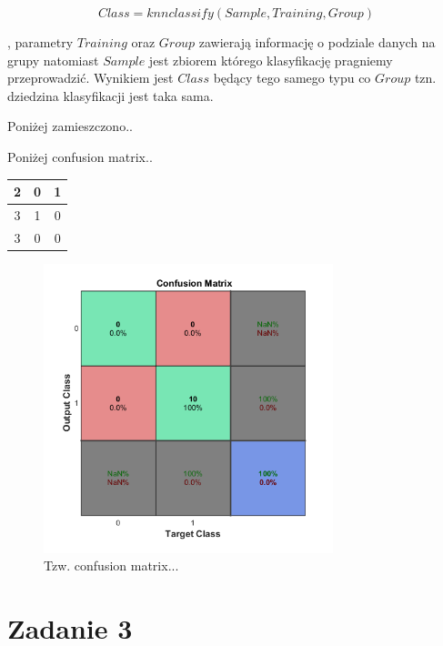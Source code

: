 \documentclass[11pt, a4paper]{article}
\begin{document}
\begin{equation}\label{eq:knnclasify}
Class = knnclassify(Sample, Training, Group)
\end{equation}

, parametry $Training$ oraz $Group$ zawierają informację o podziale danych na grupy natomiast $Sample$ jest zbiorem którego klasyfikację pragniemy przeprowadzić. Wynikiem jest $Class$ będący tego samego typu co $Group$ tzn. dziedzina klasyfikacji jest taka sama.

Poniżej zamieszczono..




Poniżej confusion matrix..

\begin{tabular}{|c|c|c|}
	\hline 
	2 & 0 & 1 \\ 
	\hline 
	3 & 1 & 0 \\ 
	\hline 
	3 & 0 & 0 \\ 
	\hline 
\end{tabular} 


\begin{figure}[H]
	\centering
	\includegraphics[width=0.75\textwidth]{./assets/ilustracja_zad2_c.png}
	\caption{Tzw. confusion matrix...}
	\label{fig:zad2c}
\end{figure}



\section{Zadanie 3}
\end{document}
